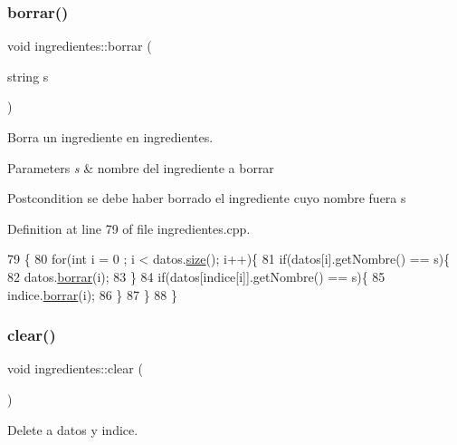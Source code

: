\subsubsection{\texorpdfstring{borrar()}{borrar()}}
{\footnotesize\ttfamily void ingredientes\+::borrar (\begin{DoxyParamCaption}\item[{string}]{s }\end{DoxyParamCaption})}



Borra un ingrediente en ingredientes. 


\begin{DoxyParams}{Parameters}
{\em s} & nombre del ingrediente a borrar \\
\hline
\end{DoxyParams}
\begin{DoxyPostcond}{Postcondition}
se debe haber borrado el ingrediente cuyo nombre fuera s 
\end{DoxyPostcond}


Definition at line 79 of file ingredientes.\+cpp.


\begin{DoxyCode}
79                                  \{
80     \textcolor{keywordflow}{for}(\textcolor{keywordtype}{int} i = 0 ; i < datos.\hyperlink{classVD_a411ad026db1c8e0617d9031f1f1017a5}{size}(); i++)\{
81         \textcolor{keywordflow}{if}(datos[i].getNombre() == s)\{
82             datos.\hyperlink{classVD_a56e6ae22f6c89d7f9f46412d4e2121a0}{borrar}(i);
83         \}
84         \textcolor{keywordflow}{if}(datos[indice[i]].getNombre() == s)\{
85             indice.\hyperlink{classVD_a56e6ae22f6c89d7f9f46412d4e2121a0}{borrar}(i);
86         \}
87     \}
88 \}
\end{DoxyCode}
\mbox{\label{classingredientes_ac7cc4f90c19935063ba0401f9aab1394}} 
\subsubsection{\texorpdfstring{clear()}{clear()}}
{\footnotesize\ttfamily void ingredientes\+::clear (\begin{DoxyParamCaption}{ }\end{DoxyParamCaption})}



Delete a datos y indice. 


